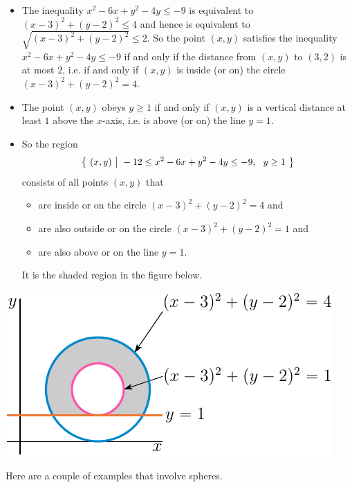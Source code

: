 \begin{eg}
\begin{itemize}
\item 
The inequality $x^2-6x +y^2-4y\le -9$ is equivalent to 
$(x-3)^2 +(y-2)^2 \le 4$ and hence is equivalent to 
$\sqrt{(x-3)^2 +(y-2)^2} \le 2$. So the point $(x,y)$ satisfies the inequality 
$x^2-6x +y^2-4y\le -9$ if and only if the distance from $(x,y)$ to $(3,2)$
is at most $2$, i.e. if and only if $(x,y)$ is inside (or on) the circle 
$(x-3)^2 +(y-2)^2 = 4$. 

\item 
The point $(x,y)$ obeys $y\ge 1$ if and only if $(x,y)$ is a vertical distance at least $1$ above the $x$-axis, i.e. is above (or on) the line $y=1$.

\item
So the region  
\begin{equation*}
\big\{ \ (x,y)\ \big|\  -12\le x^2-6x +y^2-4y \le -9,\ \ y\ge 1\ \big\}
\end{equation*}
consists of all points $(x,y)$ that 
\begin{itemize}
\item 
are inside or on the circle $(x-3)^2 +(y-2)^2 = 4$ and 
\item 
are also outside or on the circle $(x-3)^2 +(y-2)^2 = 1$ and 
\item 
are also above or on the line $y=1$. 
\end{itemize}
It is the shaded region in the figure below.
\end{itemize}

\begin{efig}
\begin{center}
   \includegraphics{annulusPartB.pdf}
\end{center}
\end{efig}

\end{eg}

Here are a couple of examples that involve spheres.

